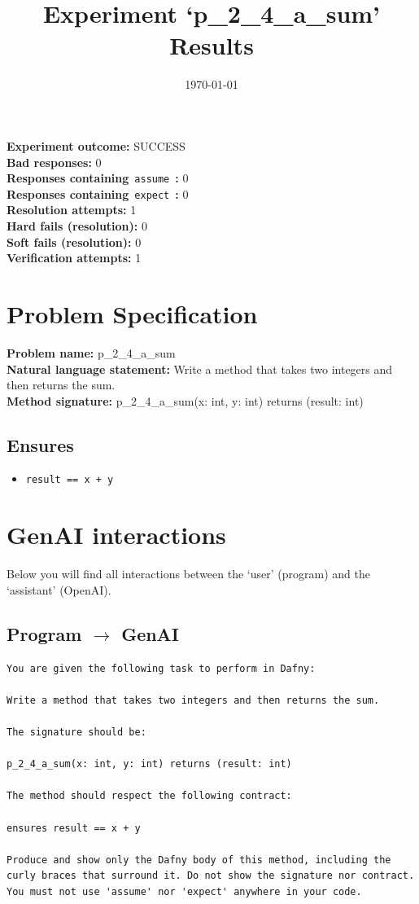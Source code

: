 \documentclass{article}
\begin{document}
\title{Experiment `p\_2\_4\_a\_sum' Results}
\author{\today}
\date{}
\maketitle
\textbf{Experiment outcome: }SUCCESS
\\\textbf{Bad responses: }0
\\\textbf{Responses containing}~\texttt{assume}~\textbf{: }0
\\\textbf{Responses containing}~\texttt{expect}~\textbf{: }0
\\\textbf{Resolution attempts: }1
\\\textbf{Hard fails (resolution): }0
\\\textbf{Soft fails (resolution): }0
\\\textbf{Verification attempts: }1
\section*{Problem Specification}
\textbf{Problem name: }p\_2\_4\_a\_sum
\\\textbf{Natural language statement: }Write a method that takes two integers and then returns the sum.
\\\textbf{Method signature: }p\_2\_4\_a\_sum(x: int, y: int) returns (result: int)
\subsection*{Ensures}
\begin{itemize}
\item \texttt{result == x + y}
\end{itemize}
\clearpage
\section*{GenAI interactions}
Below you will find all interactions between the `user' (program) and the `assistant' (OpenAI).
\subsection*{Program $\rightarrow$ GenAI}
\begin{lstlisting}
You are given the following task to perform in Dafny:

Write a method that takes two integers and then returns the sum.

The signature should be:

p_2_4_a_sum(x: int, y: int) returns (result: int)

The method should respect the following contract:

ensures result == x + y

Produce and show only the Dafny body of this method, including the curly braces that surround it. Do not show the signature nor contract. You must not use 'assume' nor 'expect' anywhere in your code.
\end{lstlisting}
\end{document}
